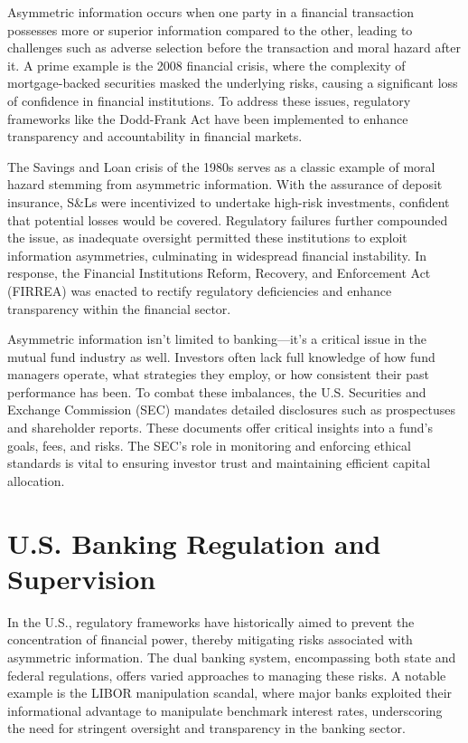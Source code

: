 
Asymmetric information occurs when one party in a financial transaction possesses more or superior information compared to the other, leading to challenges such as adverse selection before the transaction and moral hazard after it. A prime example is the 2008 financial crisis, where the complexity of mortgage-backed securities masked the underlying risks, causing a significant loss of confidence in financial institutions. To address these issues, regulatory frameworks like the Dodd-Frank Act have been implemented to enhance transparency and accountability in financial markets.

The Savings and Loan crisis of the 1980s serves as a classic example of moral hazard stemming from asymmetric information. With the assurance of deposit insurance, S\&Ls were incentivized to undertake high-risk investments, confident that potential losses would be covered. Regulatory failures further compounded the issue, as inadequate oversight permitted these institutions to exploit information asymmetries, culminating in widespread financial instability. In response, the Financial Institutions Reform, Recovery, and Enforcement Act (FIRREA) was enacted to rectify regulatory deficiencies and enhance transparency within the financial sector.

Asymmetric information isn't limited to banking—it's a critical issue in the mutual fund industry as well. Investors often lack full knowledge of how fund managers operate, what strategies they employ, or how consistent their past performance has been. To combat these imbalances, the U.S. Securities and Exchange Commission (SEC) mandates detailed disclosures such as prospectuses and shareholder reports. These documents offer critical insights into a fund’s goals, fees, and risks. The SEC’s role in monitoring and enforcing ethical standards is vital to ensuring investor trust and maintaining efficient capital allocation.

\section{U.S. Banking Regulation and Supervision}

In the U.S., regulatory frameworks have historically aimed to prevent the concentration of financial power, thereby mitigating risks associated with asymmetric information. The dual banking system, encompassing both state and federal regulations, offers varied approaches to managing these risks. A notable example is the LIBOR manipulation scandal, where major banks exploited their informational advantage to manipulate benchmark interest rates, underscoring the need for stringent oversight and transparency in the banking sector.

